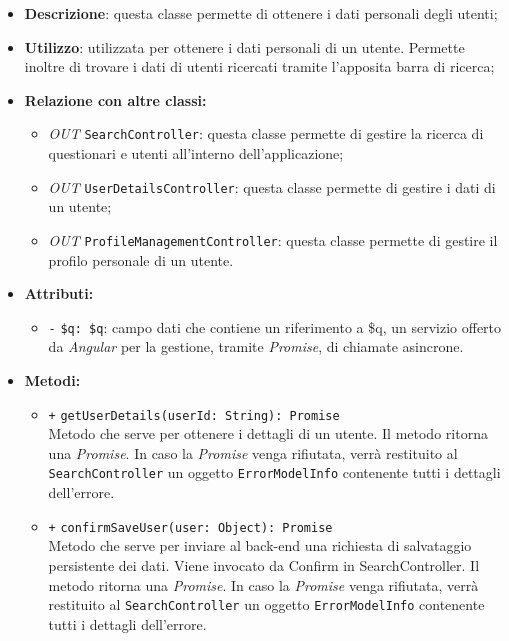 \begin{itemize}
	\item \textbf{Descrizione}: questa classe permette di ottenere i dati personali degli utenti;
	\item \textbf{Utilizzo}: utilizzata per ottenere i dati personali di un utente. Permette inoltre di trovare i dati di utenti ricercati tramite l'apposita barra di ricerca;
	\item \textbf{Relazione con altre classi:}
	\begin{itemize}
		\item \textit{OUT} \texttt{SearchController}: questa classe permette di gestire la ricerca di questionari e utenti all'interno dell'applicazione;
		\item \textit{OUT} \texttt{UserDetailsController}: questa classe permette di gestire i dati di un utente;
		\item \textit{OUT} \texttt{ProfileManagementController}: questa classe permette di gestire il profilo personale di un utente. 
	\end{itemize}
	\item \textbf{Attributi:}
	\begin{itemize}
		\item \texttt{-} \texttt{\$q: \$q}: campo dati che contiene un riferimento a \$q, un servizio offerto da \textit{Angular} per la gestione, tramite \textit{Promise}, di chiamate asincrone.
	\end{itemize}
	\item \textbf{Metodi:}
	\begin{itemize}
		\item \texttt{+} \texttt{getUserDetails(userId: String): Promise} \\ Metodo che serve per ottenere i dettagli di un utente. Il metodo ritorna una \textit{Promise}. In caso la \textit{Promise} venga rifiutata, verrà restituito al \texttt{SearchController} un oggetto \texttt{ErrorModelInfo} contenente tutti i dettagli dell'errore. \\
		\item \texttt{+} \texttt{confirmSaveUser(user: Object): Promise} \\Metodo che serve per inviare al back-end una richiesta di salvataggio persistente dei dati. Viene invocato da Confirm in SearchController. Il metodo ritorna una \textit{Promise}. In caso la \textit{Promise} venga rifiutata, verrà restituito al \texttt{SearchController} un oggetto \texttt{ErrorModelInfo} contenente tutti i dettagli dell'errore. \\
	
	\end{itemize}
\end{itemize}
